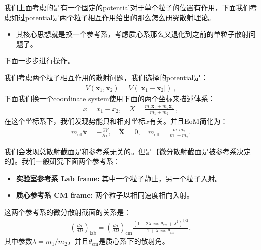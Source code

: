 我们上面考虑的是有一个固定的potential对于单个粒子的位置有作用，下面我们考虑如过potential是两个粒子相互作用给出的那么怎么研究散射理论。
\begin{itemize}
  \item 其核心思想就是换一个参考系，考虑质心系那么又退化到之前的单粒子散射问题了。
\end{itemize}
下面一步步进行操作。

\bigskip
{}

我们考虑两个粒子相互作用的散射问题，我们选择的potential是：
\begin{align}
  V(\mathbf{x}_1,\mathbf{x}_2)=V(|\mathbf{x}_1-\mathbf{x}_2|)\mathrm{~,}
\end{align}
下面我们换一个coordinate system使用下面的两个坐标来描述体系：
\begin{align}
  x=x_1-x_2 , \quad X=\frac{m_1\mathbf{x}_1+m_2\mathbf{x}_2}{m_1+m_2}\mathrm{~,}
\end{align}
在这个坐标系下，我们发现势能只和相对坐标$ x $有关。并且EoM简化为：
\begin{align}
  m_{\mathrm{eff}}\ddot{\mathbf{x}}=-\frac{\partial
  V}{\partial\mathbf{x}},\quad\ddot{\mathbf{X}}=0,\quad
  m_{\mathrm{eff}}=\frac{m_1m_2}{m_1+m_2}.
\end{align}

\bigskip
{}

我们会发现总散射截面是和参考系无关的。但是【微分散射截面是被参考系决定的】。我们一般研究下面两个参考系：
\begin{itemize}
  \item \textbf{实验室参考系 Lab frame:} 其中一个粒子静止，另一个粒子入射。
  \item \textbf{质心参考系 CM frame:} 两个粒子以相同速度相向入射。
\end{itemize}
这两个参考系的微分散射截面的关系是：
\begin{align}
  \left(\frac{d\sigma}{d\Omega}\right)_{\mathrm{lab}}=\left(\frac{d\sigma}{d\Omega}\right)_{\mathrm{cm}}\frac{\left(1+2\lambda\cos\theta_{\mathrm{cm}}+\lambda^2\right)^{3/2}}{1+\lambda\cos\theta_{\mathrm{cm}}},
\end{align}
其中参数$ \lambda = m_1 / m_2 $，并且$ \theta_{\mathrm{cm}} $是质心系下的散射角。


\bigskip
{}

